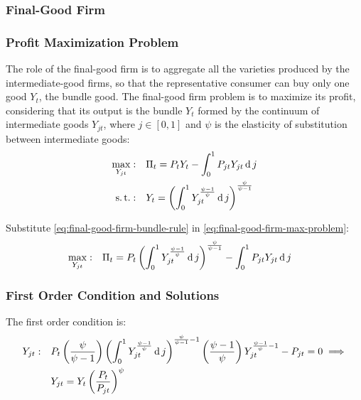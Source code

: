 \documentclass[
thesis.tex
]{subfiles}
\begin{document}
	
	\subsubsection{Final-Good Firm}
	
	\subsubsection*{Profit Maximization Problem}
	
	The role of the final-good firm is to aggregate all the varieties produced by the intermediate-good firms, so that the representative consumer can buy only one good $Y_t$, the bundle good. The final-good firm problem is to maximize its profit, considering that its output is the bundle $Y_t$ formed by the continuum of intermediate goods $Y_{jt}$, where $j \in [0,1]$ and $\psi$ is the elasticity of substitution between intermediate goods:
	\begin{align}
		\label{eq:final-good-firm-max-problem}
		\max_{Y_{jt}}: &\quad \Pi_t = P_t Y_t - \int_{0}^{1} P_{jt} Y_{jt} \operatorname{d} j\\
		\label{eq:final-good-firm-bundle-rule}
		\operatorname{s.t.}: & \quad Y_t = \left( \int_{0}^{1} Y_{jt}^{\frac{\psi-1}{\psi}} \operatorname{d} j \right)^{\frac{\psi}{\psi-1}}
	\end{align}
	
	Substitute \ref{eq:final-good-firm-bundle-rule} in \ref{eq:final-good-firm-max-problem}:
	\begin{align}
		\label{eq:final-good-firm-max-problem-2}
		\max_{Y_{jt}}: & \quad \Pi_t = P_t \left( \int_{0}^{1} Y_{jt}^{\frac{\psi-1}{\psi}} \operatorname{d} j \right)^{\frac{\psi}{\psi-1}} - \int_{0}^{1} P_{jt} Y_{jt} \operatorname{d} j
	\end{align}
	
	\subsubsection*{First Order Condition and Solutions}
	
	The first order condition is:
	\begin{align}
		Y_{jt}:\quad & P_t \left( \frac{\psi}{\psi-1} \right) \left( \int_{0}^{1} Y_{jt}^{\frac{\psi-1}{\psi}} \operatorname{d} j \right)^{\frac{\psi}{\psi-1}-1} \left( \frac{\psi-1}{\psi} \right) Y_{jt}^{\frac{\psi-1}{\psi}-1} - P_{jt} = 0 \implies \nonumber \\
		\label{eq:final-good-firm-FOC}
		& Y_{jt} = Y_t \left( \frac{P_t}{P_{jt}} \right)^{\psi}
	\end{align}
	
\end{document}
